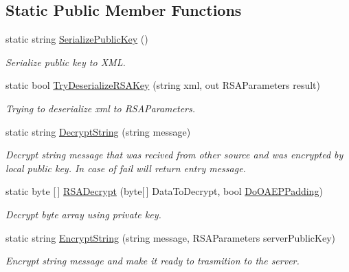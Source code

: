 \subsection*{Static Public Member Functions}
\begin{DoxyCompactItemize}
\item 
static string \mbox{\hyperlink{class_pipes_provider_1_1_security_1_1_crypto_ab931581ad69168a7d452ec2ed2a31609}{Serialize\+Public\+Key}} ()
\begin{DoxyCompactList}\small\item\em Serialize public key to X\+ML. \end{DoxyCompactList}\item 
static bool \mbox{\hyperlink{class_pipes_provider_1_1_security_1_1_crypto_a35b28e8676c9dea2c0b7991671fd78a6}{Try\+Deserialize\+R\+S\+A\+Key}} (string xml, out R\+S\+A\+Parameters result)
\begin{DoxyCompactList}\small\item\em Trying to deserialize xml to R\+S\+A\+Parameters. \end{DoxyCompactList}\item 
static string \mbox{\hyperlink{class_pipes_provider_1_1_security_1_1_crypto_a2a233d9860e9aee6b2bc49411a4e4917}{Decrypt\+String}} (string message)
\begin{DoxyCompactList}\small\item\em Decrypt string message that was recived from other source and was encrypted by local public key. In case of fail will return entry message. \end{DoxyCompactList}\item 
static byte \mbox{[}$\,$\mbox{]} \mbox{\hyperlink{class_pipes_provider_1_1_security_1_1_crypto_aeaf01f17d57b624fd4809ceb2836ebe0}{R\+S\+A\+Decrypt}} (byte\mbox{[}$\,$\mbox{]} Data\+To\+Decrypt, bool \mbox{\hyperlink{class_pipes_provider_1_1_security_1_1_crypto_a47ca964d3fea31884d730936a9be1c81}{Do\+O\+A\+E\+P\+Padding}})
\begin{DoxyCompactList}\small\item\em Decrypt byte array using private key. \end{DoxyCompactList}\item 
static string \mbox{\hyperlink{class_pipes_provider_1_1_security_1_1_crypto_ab43ab066a89134e4207ab0107f17a187}{Encrypt\+String}} (string message, R\+S\+A\+Parameters server\+Public\+Key)
\begin{DoxyCompactList}\small\item\em Encrypt string message and make it ready to trasmition to the server. \end{DoxyCompactList}\item 

\end{DoxyCompactItemize}
